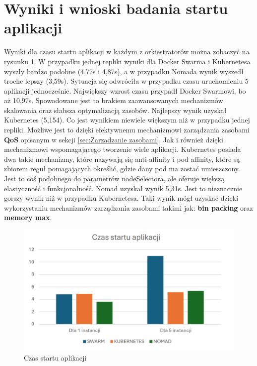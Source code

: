 \documentclass{iiuwb}
\begin{document}
\section{Wyniki i wnioski badania startu aplikacji}
\label{sec:StartAplikacji}

Wyniki dla czasu startu aplikacji w każdym z orkiestratorów 
można zobaczyć na rysunku \ref{fig: Czas startu aplikacji}. 
W przypadku jednej repliki wyniki dla Docker Swarma 
i Kubernetesa wyszły bardzo podobne (4,77s i 4,87s), a w przypadku 
Nomada wynik wyszedł troche lepszy (3,59s). Sytuacja się odwróciła 
w przypadku czasu uruchomieniu 5 aplikacji jednocześnie. 
Największy wzrost czasu przypadł Docker Swarmowi, bo aż 10,97s.
Spowodowane jest to brakiem zaawansowanych mechanizmów skalowania 
oraz słabsza optymalizacją zasobów. Najlepszy wynik uzyskał 
Kubernetes (5,154). Co jest wynikiem niewiele większym niż 
w przypadku jednej repliki. Możliwe jest to dzięki efektywnemu 
mechanizmowi zarządzania zasobami \textbf{QoS} opisanym 
w sekcji \ref{sec:Zarzadzanie zasobami}. Jak i również dzięki 
mechanizmowi wspomagającego tworzenie wiele aplikacji. 
Kubernetes posiada dwa takie mechanizmy, które nazywają się 
anti-affinity i pod affinity, które są zbiorem reguł pomagających 
określić, gdzie dany pod ma zostać umieszczony. Jest to coś 
podobnego do parametrów nodeSelectora, ale oferuje większą 
elastyczność i funkcjonalność. Nomad uzyskał wynik 5,31s. Jest 
to nieznacznie gorszy wynik niż w przypadku Kubernetesa. Taki 
wynik mógł uzyskać dzięki wykorzystaniu mechanizmów zarządzania 
zasobami takimi jak: \textbf{bin packing} 
oraz \textbf{memory max}. 

\begin{figure}[!h]
\centering
\includegraphics[width=12cm]{WynikiCzasStartu.pdf}
\caption{Czas startu aplikacji}
\label{fig: Czas startu aplikacji}
\end{figure}
\end{document}
